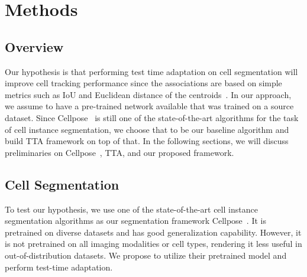 \section{Methods}

\subsection{Overview}
Our hypothesis is that performing test time adaptation on cell segmentation will improve cell tracking performance since the associations are based on simple metrics such as IoU and Euclidean distance of the centroids~\cite{bragantini2024ultrack}. In our approach, we assume to have a pre-trained network available that was trained on a source dataset. Since Cellpose~\cite{stringer2021cellpose} is still one of the state-of-the-art algorithms for the task of cell instance segmentation, we choose that to be our baseline algorithm and build TTA framework on top of that. In the following sections, we will discuss preliminaries on Cellpose~\cite{stringer2021cellpose}, TTA, and our proposed framework. 



\subsection{Cell Segmentation}

To test our hypothesis, we use one of the state-of-the-art cell instance segmentation algorithms as our segmentation framework Cellpose~\cite{stringer2021cellpose}. It is pretrained on diverse datasets and has good generalization capability. However, it is not pretrained on all imaging modalities or cell types, rendering it less useful in out-of-distribution datasets. We propose to utilize their pretrained model and perform test-time adaptation. 

